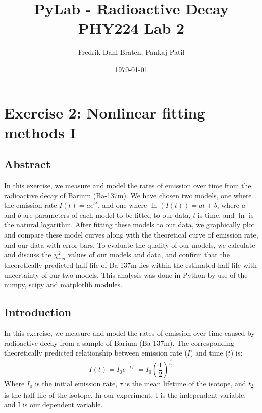 \documentclass[letterpaper,12pt]{article}
\begin{document}
\title{%
PyLab - Radioactive Decay \\
\large PHY224 Lab 2}
\author{Fredrik Dahl Bråten, Pankaj Patil}
\date{\today}
\maketitle

\section{Exercise 2:  Nonlinear fitting methods I}

\subsection{Abstract}

In this exercise, we measure and model the rates of emission over time from the radioactive decay of Barium (Ba-137m). 
We have chosen two models, one where the emission rate $I(t) = ae^{bt}$, and one where $\ln(I(t)) = at+b$, 
where $a$ and $b$ are parameters of each model to be fitted to our data, 
$t$ is time, and $\ln$ is the natural logarithm. 
After fitting these models to our data, we graphically plot and 
compare these model curves along with the theoretical curve of emission rate, and our data with error bars. 
To evaluate the quality of our models, we calculate and discuss the $\chi^2_{red}$ values of our models and data, 
and confirm that the theoretically predicted half-life of Ba-137m lies within the estimated half life with 
uncertainty of our two models. 
This analysis was done in Python by use of the numpy, scipy and matplotlib modules.

\subsection{Introduction}

In this exercise, we measure and model the rates of emission over time caused 
by radioactive decay from a sample of Barium (Ba-137m). 
The corresponding theoretically predicted relationship between emission 
rate ($I$) and time ($t$) is:
$$I(t) = I_0e^{-t/\tau} = I_0 (\frac{1}{2})^{\frac{t}{t_{\frac{1}{2}}}}$$ 
Where $I_0$ is the initial emission rate, $\tau$ is the mean lifetime of the 
isotope, and $t_{\frac{1}{2}}$ is the half-life of the isotope. 
In our experiment, t is the independent variable, and I is our dependent variable.
\end{document}
